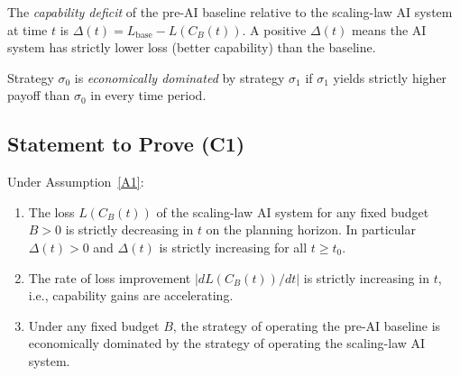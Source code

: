 \begin{definition}
  The \emph{capability deficit} of the pre-AI baseline relative to the
  scaling-law AI system at time $t$ is
  $\Delta(t) = L_{\mathrm{base}} - L(C_B(t))$.
  A positive $\Delta(t)$ means the AI system has strictly lower loss
  (better capability) than the baseline.
\end{definition}

\begin{definition}
  Strategy $\sigma_0$ is \emph{economically dominated} by strategy
  $\sigma_1$ if $\sigma_1$ yields strictly higher payoff than $\sigma_0$
  in every time period.
\end{definition}

\subsection*{Statement to Prove (C1)}

\begin{theorem}\label{thm:C1}
  Under Assumption~\ref{A1}:
  \begin{enumerate}
    \item[(i)] The loss $L(C_B(t))$ of the scaling-law AI system for
      any fixed budget $B > 0$ is strictly decreasing in $t$ on the
      planning horizon.  In particular $\Delta(t) > 0$ and $\Delta(t)$
      is strictly increasing for all $t \geq t_0$.
    \item[(ii)] The rate of loss improvement $|dL(C_B(t))/dt|$ is
      strictly increasing in $t$, i.e., capability gains are accelerating.
    \item[(iii)] Under any fixed budget $B$, the strategy of operating
      the pre-AI baseline is economically dominated by the strategy of
      operating the scaling-law AI system.
  \end{enumerate}
\end{theorem}

